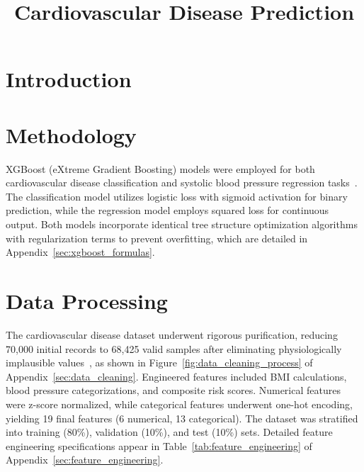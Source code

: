 \documentclass[conference]{IEEEtran}
\begin{document}
\title{Cardiovascular Disease Prediction}


\author{

}

\maketitle

\begin{abstract}

\end{abstract}

\begin{IEEEkeywords}

\end{IEEEkeywords}

\section{Introduction}


\section{Methodology}

XGBoost (eXtreme Gradient Boosting) models were employed for both cardiovascular disease classification and systolic blood pressure regression tasks~\cite{chen2016xgboost}. The classification model utilizes logistic loss with sigmoid activation for binary prediction, while the regression model employs squared loss for continuous output. Both models incorporate identical tree structure optimization algorithms with regularization terms to prevent overfitting, which are detailed in Appendix~\ref{sec:xgboost_formulas}.

\section{Data Processing}

The cardiovascular disease dataset underwent rigorous purification, reducing 70,000 initial records to 68,425 valid samples after eliminating physiologically implausible values~\cite{cardiovascular_dataset}, as shown in Figure~\ref{fig:data_cleaning_process} of Appendix~\ref{sec:data_cleaning}. Engineered features included BMI calculations, blood pressure categorizations, and composite risk scores. Numerical features were z-score normalized, while categorical features underwent one-hot encoding, yielding 19 final features (6 numerical, 13 categorical). The dataset was stratified into training (80\%), validation (10\%), and test (10\%) sets. Detailed feature engineering specifications appear in Table~\ref{tab:feature_engineering} of Appendix~\ref{sec:feature_engineering}.
\end{document}
